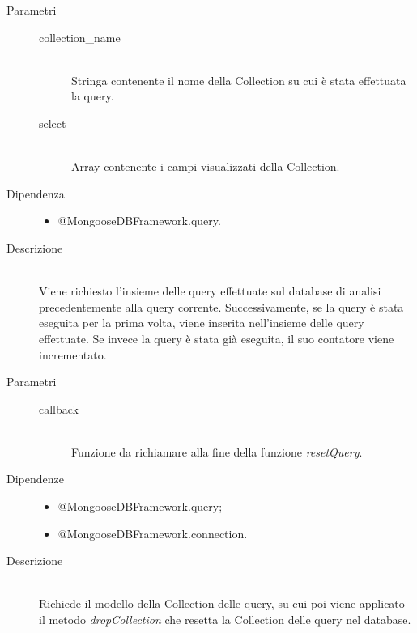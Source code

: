 \begin{description}
\begin{mldescription}
    \begin{description}
	 \item[Parametri] \hfill
	  \begin{description}
	   \item[collection\_name] \hfill \\
	   Stringa contenente il nome della Collection su cui è stata effettuata la query.
	   \item[select] \hfill \\
	   Array contenente i campi visualizzati della Collection.
	  \end{description}
	 \item[Dipendenza] \hfill
	  \begin{itemize}
	   \item @MongooseDBFramework.query.
	  \end{itemize}
	 \item[Descrizione] \hfill \\
	 Viene richiesto l'insieme delle query effettuate sul database di analisi precedentemente alla query corrente. Successivamente, se la query è stata eseguita per la prima volta, viene inserita nell'insieme delle query effettuate. Se invece la query è stata già eseguita, il suo contatore viene incrementato.
	\end{description}	    
    
    \begin{description}
	 \item[Parametri] \hfill
	  \begin{description}
	   \item[callback] \hfill \\
	   Funzione da richiamare alla fine della funzione \textit{resetQuery}.
	  \end{description}
	 \item[Dipendenze] \hfill
	  \begin{itemize}
	   \item @MongooseDBFramework.query;
	   \item @MongooseDBFramework.connection.
	  \end{itemize}
	 \item[Descrizione] \hfill \\
	 Richiede il modello della Collection delle query, su cui poi viene applicato il metodo \textit{dropCollection} che resetta la Collection delle query nel database.
	\end{description}	    
    

\end{mldescription}
\end{description}
